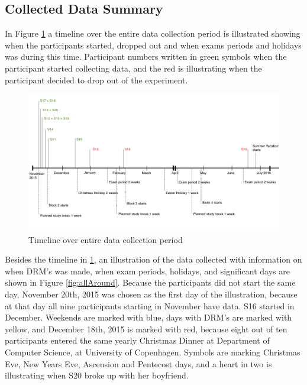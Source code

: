 \documentclass[12pt]{article} %
\begin{document}
\subsection{Collected Data Summary}
In Figure \ref{fig:timeline} a timeline over the entire data collection period is illustrated showing when the participants started, dropped out and when exams periods and holidays was during this time. Participant numbers written in green symbols when the participant started collecting data, and the red is illustrating when the participant decided to drop out of the experiment. 

\begin{figure}[H]
    \centering
        \includegraphics[width=\textwidth]{img/timeline}
        \caption{Timeline over entire data collection period}
        \label{fig:timeline}
\end{figure}

Besides the timeline in \ref{fig:timeline}, an illustration of the data collected with information on when DRM's was made, when exam periods, holidays, and significant days are shown in Figure \ref{fig:allAround}. Because the participants did not start the same day, November 20th, 2015 was chosen as the first day of the illustration, because at that day all nine participants starting in November have data. S16 started in December. Weekends are marked with blue, days with DRM's are marked with yellow, and December 18th, 2015 is marked with red, because eight out of ten participants entered the same yearly Christmas Dinner at Department of Computer Science, at University of Copenhagen. Symbols are marking Christmas Eve, New Years Eve, Ascension and Pentecost days, and a heart in two is illustrating when S20 broke up with her boyfriend. 
\end{document}
